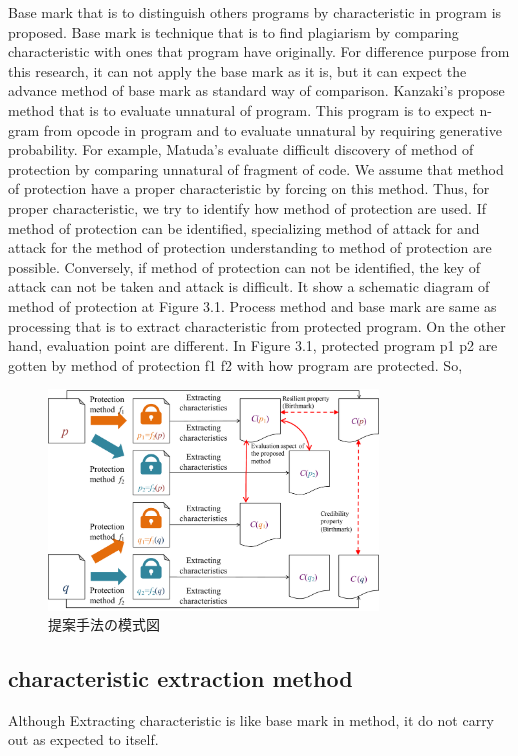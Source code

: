 \documentclass[conference]{IEEEtran}
\begin{document}
Base mark that is to distinguish others programs by characteristic in
program is proposed.  Base mark is technique that is to find
plagiarism by comparing characteristic with ones that program have
originally.  For difference purpose from this research, it can not
apply the base mark as it is, but it can expect the advance method of
base mark as standard way of comparison.  Kanzaki's propose method
that is to evaluate unnatural of program.  This program is to expect
n-gram from opcode in program and to evaluate unnatural by requiring
generative probability.  For example, Matuda's evaluate difficult
discovery of method of protection by comparing unnatural of fragment
of code.  We assume that method of protection have a proper
characteristic by forcing on this method.  Thus, for proper
characteristic, we try to identify how method of protection are used.
If method of protection can be identified, specializing method of
attack for and attack for the method of protection understanding to
method of protection are possible.  Conversely, if method of
protection can not be identified, the key of attack can not be taken
and attack is difficult.  It show a schematic diagram of method of
protection at Figure 3.1.  Process method and base mark are same as
processing that is to extract characteristic from protected program.
On the other hand, evaluation point are different.
In Figure 3.1, protected program p1 p2 are gotten by method of
protection f1 f2 with how program are protected.  So,
\begin{figure}[b]
  \centering
  \includegraphics[width=0.78\textwidth]{images/key_idea}
  \caption{提案手法の模式図}\label{fig:keyidea}
\end{figure}


\subsection{characteristic extraction method}
Although Extracting characteristic is like base mark in method,
it do not carry out as expected to itself.
\end{document}

